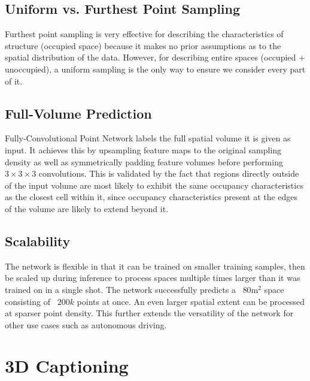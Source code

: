\documentclass[runningheads]{llncs}
\begin{document}
\subsection{Uniform vs. Furthest Point Sampling}

Furthest point sampling is very effective for describing the characteristics of structure (occupied space) because it makes no prior assumptions as to the spatial distribution of the data. However, for describing entire spaces (occupied + unoccupied), a uniform sampling is the only way to ensure we consider every part of it.





\subsection{Full-Volume Prediction}

Fully-Convolutional Point Network labels the full spatial volume it is given as input. It achieves this by upsampling feature maps to the original sampling density as well as symmetrically padding feature volumes before performing $3\times 3\times 3$ convolutions. This is validated by the fact that regions directly outside of the input volume are most likely to exhibit the same occupancy characteristics as the closest cell within it, since occupancy characteristics present at the edges of the volume are likely to extend beyond it.

\subsection{Scalability}

The network is flexible in that it can be trained on smaller training samples, then be scaled up during inference to process spaces multiple times larger than it was trained on in a single shot. The network successfully predicts a ~$80$m$^2$ space consisting of ~$200k$ points at once. An even larger spatial extent can be processed at sparser point density. This further extends the versatility of the network for other use cases such as autonomous driving.

\section{3D Captioning}
\label{section:Captioning}
\end{document}
